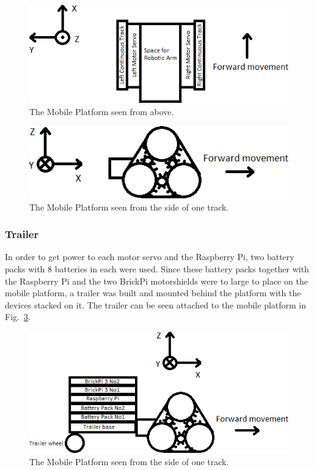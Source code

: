 \begin{figure}[h]
    \centering
    \includegraphics[width=\linewidth]{sections/assets/Mobile_platform_paint_text3_horiz.PNG}
    \caption{The Mobile Platform seen from above.}
    \label{Mobile_platform_paint}
\end{figure}


\begin{figure}[h]
    \centering
    \includegraphics[width =\linewidth]{sections/assets/Band_platform_coordinates.PNG}
    \caption{The Mobile Platform seen from the side of one track.}
    \label{Band_platform_coordinates}
\end{figure}

\subsubsection{Trailer}
In order to get power to each motor servo and the Raspberry Pi, two battery packs with 8 batteries in each were used. Since these battery packs together with the Raspberry Pi and the two BrickPi motorshields were to large to place on the mobile platform, a trailer was built and mounted behind the platform with the devices stacked on it. The trailer can be seen attached to the mobile platform in Fig.~\ref{Trailer}.

\begin{figure}[h]
    \centering
    \includegraphics[width =\linewidth]{sections/assets/Trailer.PNG}
    \caption{The Mobile Platform seen from the side of one track.}
    \label{Trailer}
\end{figure}

